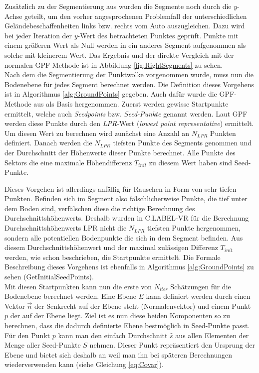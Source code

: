 Zusätzlich zu der Segmentierung aus \cite{bib:Segmentation1} wurden die Segmente noch durch die $y$-Achse geteilt, um den vorher angesprochenen Problemfall der unterschiedlichen Geländebeschaffenheiten links bzw. rechts vom Auto auszugleichen. Dazu wird bei jeder Iteration der $y$-Wert des betrachteten Punktes geprüft. Punkte mit einem größeren Wert als Null werden in ein anderes Segment aufgenommen als solche mit kleinerem Wert. Das Ergebnis und der direkte Vergleich mit der normalen GPF-Methode ist in Abbildung \ref{fig:RightSegments} zu sehen.\\

Nach dem die Segmentierung der Punktwolke vorgenommen wurde, muss nun die Bodenebene für jedes Segment berechnet werden. Die Definition dieses Vorgehens ist in Algorithmus \ref{alg:GroundPoints} gegeben. Auch dafür wurde die GPF-Methode aus \cite{bib:Segmentation1} als Basis hergenommen. Zuerst werden gewisse Startpunkte ermittelt, welche auch \textit{Seedpoints} bzw. \textit{Seed-Punkte} genannt werden. Laut GPF werden diese Punkte durch den \textit{LPR}-Wert (\textit{lowest point representative}) ermittelt. Um diesen Wert zu berechnen wird zunächst eine Anzahl an  $N_{LPR}$ Punkten definiert. Danach werden die $N_{LPR}$ tiefsten Punkte des Segments genommen und der Durchschnitt der Höhenwerte dieser Punkte berechnet. Alle Punkte des Sektors die eine maximale Höhendifferenz $T_{init}$ zu diesem Wert haben sind Seed-Punkte. 

Dieses Vorgehen ist allerdings anfällig für Rauschen in Form von sehr tiefen Punkten. Befinden sich im Segment also fälschlicherweise Punkte, die tief unter dem Boden sind, verfälschen diese die richtige Berechnung des Durchschnittshöhenwerts. Deshalb wurden in C.LABEL-VR für die Berechnung Durchschnittshöhenwerts LPR nicht die $N_{LPR}$ tiefsten Punkte hergenommen, sondern alle potentiellen Bodenpunkte die sich in dem Segment befinden. Aus diesem Durchschnittshöhenwert und der maximal zulässigen Differenz $T_{init}$ werden, wie schon beschrieben, die Startpunkte ermittelt. Die Formale Beschreibung dieses Vorgehens ist ebenfalls in Algorithmus \ref{alg:GroundPoints} zu sehen (GetInitialSeedPoints).\\

Mit diesen Startpunkten kann nun die erste von $N_{iter}$ Schätzungen für die Bodenebene berechnet werden. Eine Ebene $E$ kann definiert werden durch einen Vektor $\vec{n}$ der Senkrecht auf der Ebene steht (Normalenvektor) und einem Punkt $p$ der auf der Ebene liegt. Ziel ist es nun diese beiden Komponenten so zu berechnen, dass die dadurch definierte Ebene bestmöglich in Seed-Punkte passt. Für den Punkt $p$ kann man den einfach Durchschnitt $\hat{s}$ aus allen Elementen der Menge aller Seed-Punkte $S$ nehmen. Dieser Punkt repräsentiert den Ursprung der Ebene und bietet sich deshalb an weil man ihn bei späteren Berechnungen wiederverwenden kann (siehe Gleichung \ref{eq:Covar}).

